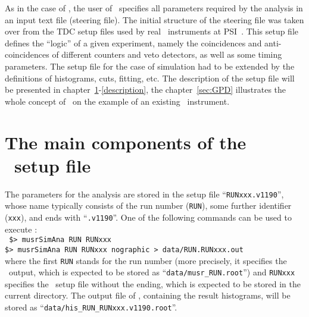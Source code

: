 \documentclass[twoside]{dis04}
\begin{document}
As in the case of \musrSim, the user of \musrSimAna\ specifies all parameters
required by the analysis in an input text file (steering file).  The initial structure
of the steering file was taken over from the TDC setup files used by real \musr\ instruments 
at PSI~\cite{acquisitionProkscha,TDCsetup}.  This setup file defines the ``logic'' of a given experiment,
namely the coincidences and anti-coincidences of different counters and veto detectors, as well as some
timing parameters.
The setup file for the case of simulation had to be extended by the definitions of
histograms, cuts, fitting, etc.  The description of the setup file will be
presented in chapter~\ref{howToAnalyse}-\ref{description}, the chapter~\ref{sec:GPD}
illustrates the whole concept of \musrSimAna\ on the example of an existing \musr\ instrument.



\section{The main components of the \musrSimAna\ setup file}
\label{howToAnalyse}
The parameters for the analysis are stored in the setup file ``{\tt RUNxxx.v1190}'', whose name 
typically consists of the run number ({\tt RUN}), 
some further identifier ({\tt xxx}), and ends with ``{\tt .v1190}''. 
One of the following commands can be used to execute \musrSimAna: \\[1em]
{\tt
\$> musrSimAna RUN RUNxxx \\
\$> musrSimAna RUN RUNxxx nographic > data/RUN.RUNxxx.out
}\\[1em]
where the first {\tt RUN} stands for the run number (more precisely, it specifies 
the \musrSim\ output, which is expected to be stored as ``{\tt data/musr\_RUN.root}'')
and {\tt RUNxxx} specifies the \musrSimAna\ setup file without the ending, which is
expected to be stored in the current directory.  The output file of \musrSimAna,
containing the result histograms, will be stored as ``{\tt data/his\_RUN\_RUNxxx.v1190.root}''.
\end{document}
